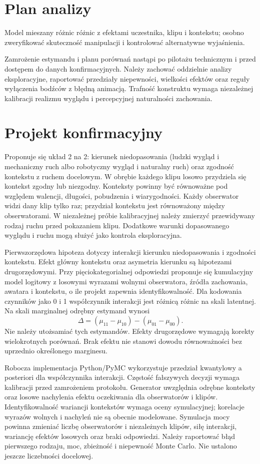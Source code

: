 \documentclass[11pt,a4paper]{article}
\begin{document}
\section{Plan analizy}
Model mieszany różnic różnic z efektami uczestnika, klipu i kontekstu; osobno zweryfikować skuteczność manipulacji i kontrolować alternatywne wyjaśnienia.

Zamrożenie estymandu i planu porównań nastąpi po pilotażu technicznym i przed dostępem do danych konfirmacyjnych. Należy zachować oddzielnie analizy eksploracyjne, raportować przedziały niepewności, wielkości efektów oraz reguły wyłączenia bodźców z błędną animacją. Trafność konstruktu wymaga niezależnej kalibracji realizmu wyglądu i percepcyjnej naturalności zachowania.
\section{Projekt konfirmacyjny}
Proponuje się układ 2 na 2: kierunek niedopasowania (ludzki wygląd i mechaniczny ruch albo robotyczny wygląd i naturalny ruch) oraz zgodność kontekstu z ruchem docelowym. W obrębie każdego klipu losowo przydziela się kontekst zgodny lub niezgodny. Konteksty powinny być równoważne pod względem walencji, długości, pobudzenia i wiarygodności. Każdy obserwator widzi dany klip tylko raz; przydział kontekstu jest równoważony między obserwatorami. W niezależnej próbie kalibracyjnej należy zmierzyć przewidywany rodzaj ruchu przed pokazaniem klipu. Dodatkowe warunki dopasowanego wyglądu i ruchu mogą służyć jako kontrola eksploracyjna.

Pierwszorzędowa hipoteza dotyczy interakcji kierunku niedopasowania i zgodności kontekstu. Efekt główny kontekstu oraz asymetria kierunku są hipotezami drugorzędowymi. Przy pięciokategorialnej odpowiedzi proponuje się kumulacyjny model logitowy z losowymi wyrazami wolnymi obserwatora, źródła zachowania, awatara i kontekstu, o ile projekt zapewnia identyfikowalność. Dla kodowania czynników jako 0 i 1 współczynnik interakcji jest różnicą różnic na skali latentnej. Na skali marginalnej odrębny estymand wynosi
\[
\Delta=(\mu_{11}-\mu_{10})-(\mu_{01}-\mu_{00}).
\]
Nie należy utożsamiać tych estymandów. Efekty drugorzędowe wymagają korekty wielokrotnych porównań. Brak efektu nie stanowi dowodu równoważności bez uprzednio określonego marginesu.

Robocza implementacja Python/PyMC wykorzystuje przedział kwantylowy a posteriori dla współczynnika interakcji. Częstość fałszywych decyzji wymaga kalibracji przed zamrożeniem protokołu. Generator uwzględnia odrębne konteksty oraz losowe nachylenia efektu oczekiwania dla obserwatorów i klipów. Identyfikowalność wariancji kontekstów wymaga oceny symulacyjnej; korelacje wyrazów wolnych i nachyleń nie są obecnie modelowane. Symulacja mocy powinna zmieniać liczbę obserwatorów i niezależnych klipów, siłę interakcji, wariancję efektów losowych oraz braki odpowiedzi. Należy raportować błąd pierwszego rodzaju, moc, zbieżność i niepewność Monte Carlo. Nie ustalono jeszcze liczebności docelowej.
\end{document}
